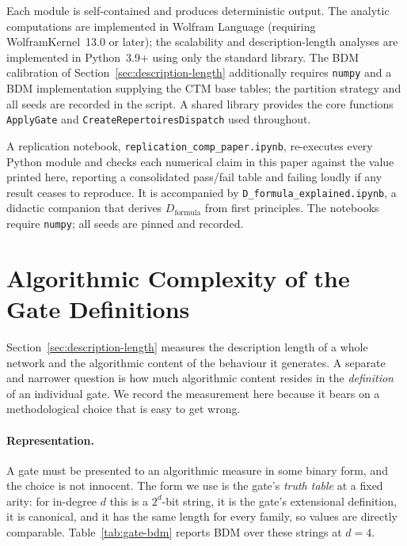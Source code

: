 \documentclass[11pt]{article}
\begin{document}
Each module is self-contained and produces deterministic output.
The analytic computations are implemented in Wolfram Language
(requiring WolframKernel~13.0 or later); the scalability and
description-length analyses are implemented in Python~3.9+ using only the
standard library.  The BDM calibration of
Section~\ref{sec:description-length} additionally requires \texttt{numpy}
and a BDM implementation supplying the CTM base tables; the partition
strategy and all seeds are recorded in the script.  A shared library
provides the core functions \texttt{ApplyGate} and
\texttt{CreateRepertoiresDispatch} used throughout.

A replication notebook, \texttt{replication\_comp\_paper.ipynb},
re-executes every Python module and checks each numerical claim in this
paper against the value printed here, reporting a consolidated pass/fail
table and failing loudly if any result ceases to reproduce.  It is
accompanied by \texttt{D\_formula\_explained.ipynb}, a didactic companion
that derives $D_{\mathrm{formula}}$ from first principles.  The notebooks
require \texttt{numpy}; all seeds are pinned and recorded.


\section{Algorithmic Complexity of the Gate Definitions}\label{app:gate-bdm}

Section~\ref{sec:description-length} measures the description length of a whole
network and the algorithmic content of the behaviour it generates.  A separate
and narrower question is how much algorithmic content resides in the
\emph{definition} of an individual gate.  We record the measurement here
because it bears on a methodological choice that is easy to get wrong.

\paragraph{Representation.}
A gate must be presented to an algorithmic measure in some binary form, and the
choice is not innocent.  The form we use is the gate's \emph{truth table} at a
fixed arity: for in-degree $d$ this is a $2^d$-bit string, it is the gate's
extensional definition, it is canonical, and it has the same length for every
family, so values are directly comparable.  Table~\ref{tab:gate-bdm} reports
BDM over these strings at $d=4$.
\end{document}
